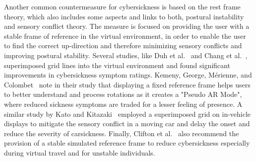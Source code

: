 Another common countermeasure for cybersickness is based on the rest frame theory, which also includes some aspects and
links to both, postural instability and sensory conflict theory.
The measure is focused on providing the user with a stable frame of reference in the virtual environment, in order
to enable the user to find the correct up-direction and therefore minimizing sensory conflicts and improving postural
stability.
Several studies, like Duh et al.~\cite{Duh2001b} and Chang et al.~\cite{Chang2013}, superimposed grid lines into the
virtual environment and found significant improvements in cybersickness symptom ratings.
Kemeny, George, M\'erienne, and Colombet~\cite{Kemeny2017} note in their study that displaying a fixed reference
frame helps users to better understand and process rotations as it creates a "Pseudo AR Mode", where reduced sickness
symptoms are traded for a lesser feeling of presence.
A similar study by Kato and Kitazaki~\cite{Kato2008} employed a superimposed grid on in-vehicle displays to mitigate
the sensory conflict in a moving car and delay the onset and reduce the severity of carsickness.
Finally, Clifton et al.~\cite{Clifton2020} also recommend the provision of a stable simulated reference frame to
reduce cybersickness especially during virtual travel and for unstable individuals.
